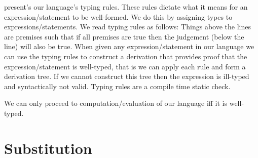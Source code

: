 \documentclass[10pt,a4paper,british,final]{article}
\begin{document}
 present's our language's typing rules.
These rules dictate what it means for an expression/statement to be well-formed.
We do this by assigning types to expressions/statements.
We read typing rules as follows: Things above the lines are premises such that if all premises are true then the judgement (below the line) will also be true.
When given any expression/statement in our language we can use the typing rules to construct a derivation that provides proof that the expression/statement is well-typed, that is we can apply each rule and form a derivation tree.
If we cannot construct this tree then the expression is ill-typed and syntactically not valid.
Typing rules are a compile time static check.

We can only proceed to computation/evaluation of our language iff it is well-typed.

\section{Substitution}\label{sec:substitution}
\end{document}
